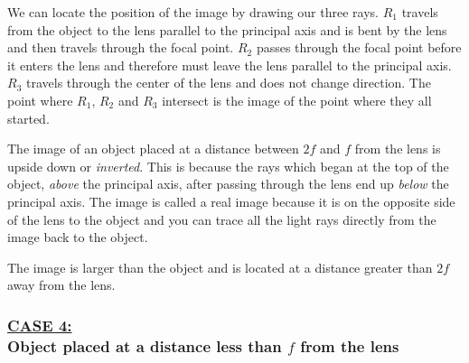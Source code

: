 We can locate the position of the image by drawing our three rays. $R_{1}$ travels from the object to the lens parallel to the principal axis and is bent by the lens and then travels through the focal point. $R_{2}$ passes through the focal point before it enters the lens and therefore must leave the lens parallel to the principal axis. $R_{3}$ travels through the center of the lens and does not change direction. The point where $R_{1}$, $R_{2}$ and $R_{3}$ intersect is the image of the point where they all started. 

The image of an object placed at a distance between $2f$ and $f$ from the lens is upside down or \textit{inverted}. This is because the rays which began at the top of the object, \textit{above} the principal axis, after passing through the lens end up \textit{below} the principal axis. The image is called a real image because it is on the opposite side of the lens to the object and you can trace all the light rays directly from the image back to the object.

The image is larger than the object and is located at a distance greater than $2f$ away from the lens.

\subsubsection{\underline{CASE 4:}\\Object placed at a distance less than $f$ from the lens}

